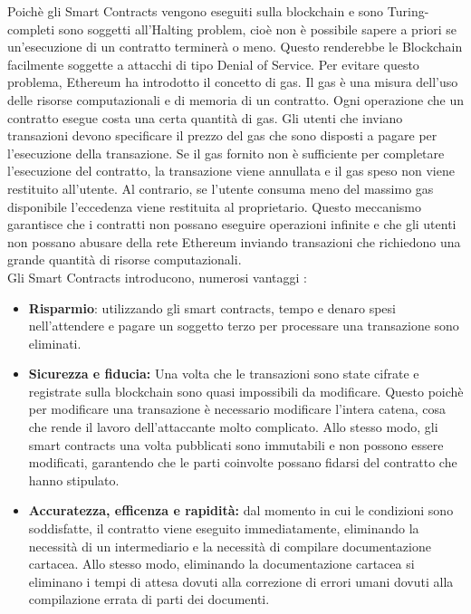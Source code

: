 \documentclass[../../Thesis.tex]{subfiles}
\begin{document}
Poichè gli Smart Contracts vengono eseguiti sulla blockchain e sono Turing-completi sono soggetti all'Halting problem, cioè non è possibile sapere a priori se un'esecuzione di un contratto terminerà o meno. Questo renderebbe le Blockchain facilmente soggette a attacchi di tipo Denial of Service. Per evitare questo problema, Ethereum ha introdotto il concetto di gas. Il gas è una misura dell'uso delle risorse computazionali e di memoria di un contratto. Ogni operazione che un contratto esegue costa una certa quantità di gas. Gli utenti che inviano transazioni devono specificare il prezzo del gas che sono disposti a pagare per l'esecuzione della transazione. Se il gas fornito non è sufficiente per completare l'esecuzione del contratto, la transazione viene annullata e il gas speso non viene restituito all'utente. Al contrario, se l'utente consuma meno del massimo gas disponibile l'eccedenza viene restituita al proprietario. Questo meccanismo garantisce che i contratti non possano eseguire operazioni infinite e che gli utenti non possano abusare della rete Ethereum inviando transazioni che richiedono una grande quantità di risorse computazionali.\\
Gli Smart Contracts introducono, numerosi vantaggi \cite{SCReview}:
\begin{itemize}
    \item \textbf{Risparmio}: utilizzando gli smart contracts, tempo e denaro spesi nell'attendere e pagare un soggetto terzo per processare una transazione sono eliminati. 
    \item \textbf{Sicurezza e fiducia:} Una volta che le transazioni sono state cifrate e registrate sulla blockchain sono quasi impossibili da modificare. Questo poichè per modificare una transazione è necessario modificare l'intera catena, cosa che rende il lavoro dell'attaccante molto complicato. Allo stesso modo, gli smart contracts una volta pubblicati sono immutabili e non possono essere modificati, garantendo che le parti coinvolte possano fidarsi del contratto che hanno stipulato.
    \item \textbf{Accuratezza, efficenza e rapidità:} dal momento in cui le condizioni sono soddisfatte, il contratto viene eseguito immediatamente, eliminando la necessità di un intermediario e la necessità di compilare documentazione cartacea. Allo stesso modo, eliminando la documentazione cartacea si eliminano i tempi di attesa dovuti alla correzione di errori umani dovuti alla compilazione errata di parti dei documenti. 
    
\end{itemize}
\end{document}
